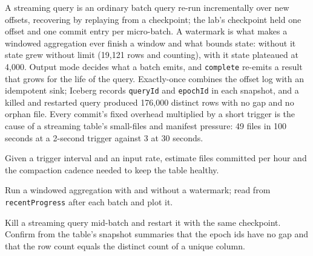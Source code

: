 A streaming query is an ordinary batch query re-run incrementally over new offsets,
recovering by replaying from a checkpoint; the lab's checkpoint held one offset and
one commit entry per micro-batch. A watermark is what makes a windowed aggregation
ever finish a window and what bounds state: without it state grew without limit
(19,121 rows and counting), with it state plateaued at 4,000. Output mode decides
what a batch emits, and \texttt{complete} re-emits a result that grows for the life
of the query. Exactly-once combines the offset log with an idempotent sink; Iceberg
records \texttt{queryId} and \texttt{epochId} in each snapshot, and a killed and
restarted query produced 176,000 distinct rows with no gap and no orphan file.
Every commit's fixed overhead multiplied by a short trigger is the cause of a
streaming table's small-files and manifest pressure: 49 files in 100 seconds at a
2-second trigger against 3 at 30 seconds.

\exercisehead
\begin{exercises}
\item Given a trigger interval and an input rate, estimate files committed per
      hour and the compaction cadence needed to keep the table healthy.
\item Run a windowed aggregation with and without a watermark; read
       from \texttt{recentProgress} after each
      batch and plot it.
\item Kill a streaming query mid-batch and restart it with the same checkpoint.
      Confirm from the table's snapshot summaries that the epoch ids have no gap
      and that the row count equals the distinct count of a unique column.
\end{exercises}
